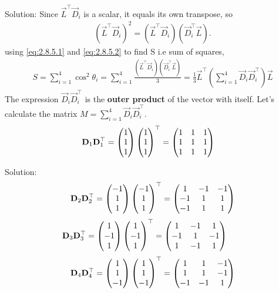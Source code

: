 \documentclass{beamer}
\begin{document}
\begin{frame}{Solution: }
\noindent
Since $\vec{L}^\top \vec{D}_i$ is a scalar, it equals its own transpose, so 
\begin{align}
(\vec{L}^\top \vec{D}_i)^2 = (\vec{L}^\top \vec{D}_i)(\vec{D}_i^\top \vec{L}).  
\label{eq:2.8.5.2}
\end{align}
using \eqref{eq:2.8.5.1} and \eqref{eq:2.8.5.2} to find S i.e sum of squares,
\begin{align} 
    S = \sum_{i=1}^{4} \cos^2\theta_i = \sum_{i=1}^{4} \frac{(\vec{L}^\top \vec{D}_i)(\vec{D}_i^\top \vec{L})}{3} = \frac{1}{3} \vec{L}^\top \left( \sum_{i=1}^{4} \vec{D}_i \vec{D}_i^\top \right) \vec{L}
    \label{eq:quad.form}
\end{align}
The expression $\vec{D}_i \vec{D}_i^\top$ is the \textbf{outer product} of the vector with itself. Let's calculate the matrix $M = \sum_{i=1}^{4} \vec{D}_i \vec{D}_i^\top$.
\begin{align*}
    \mathbf{D}_1\mathbf{D}_1^\top &= \begin{pmatrix}1\\1\\1\end{pmatrix}\begin{pmatrix}1\\1\\1\end{pmatrix}^\top = \begin{pmatrix}1&1&1\\1&1&1\\1&1&1\end{pmatrix}\quad \\
\end{align*}

\end{frame}

\begin{frame}{Solution: }
\noindent
\begin{align*}
\mathbf{D}_2\mathbf{D}_2^\top = \begin{pmatrix}-1\\1\\1\end{pmatrix}\begin{pmatrix}-1\\1\\1\end{pmatrix}^\top = \begin{pmatrix}1&-1&-1\\-1&1&1\\-1&1&1\end{pmatrix} \nonumber \\
\end{align*}
\begin{align*}
    \mathbf{D}_3\mathbf{D}_3^\top &= \begin{pmatrix}1\\-1\\1\end{pmatrix}\begin{pmatrix}1\\-1\\1\end{pmatrix}^\top = \begin{pmatrix}1&-1&1\\-1&1&-1\\1&-1&1\end{pmatrix} \quad    
\end{align*}
\begin{align*}
    \mathbf{D}_4\mathbf{D}_4^\top = \begin{pmatrix}1\\1\\-1\end{pmatrix}\begin{pmatrix}1\\1\\-1\end{pmatrix}^\top = \begin{pmatrix}1&1&-1\\1&1&-1\\-1&-1&1\end{pmatrix} \nonumber
\end{align*}

\end{frame}
\end{document}
